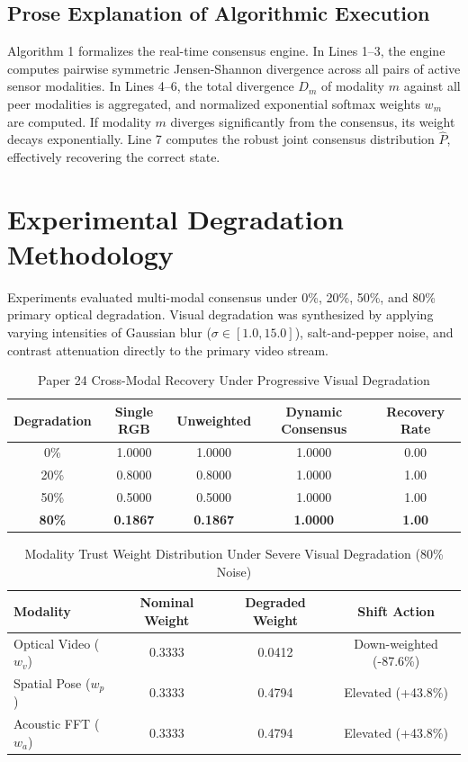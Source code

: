 \documentclass[conference]{IEEEtran}
\begin{document}
\subsection{Prose Explanation of Algorithmic Execution}
Algorithm 1 formalizes the real-time consensus engine. In Lines 1--3, the engine computes pairwise symmetric Jensen-Shannon divergence across all pairs of active sensor modalities. In Lines 4--6, the total divergence $D_m$ of modality $m$ against all peer modalities is aggregated, and normalized exponential softmax weights $w_m$ are computed. If modality $m$ diverges significantly from the consensus, its weight decays exponentially. Line 7 computes the robust joint consensus distribution $\hat{P}$, effectively recovering the correct state.

\section{Experimental Degradation Methodology}
Experiments evaluated multi-modal consensus under 0\%, 20\%, 50\%, and 80\% primary optical degradation. Visual degradation was synthesized by applying varying intensities of Gaussian blur ($\sigma \in [1.0, 15.0]$), salt-and-pepper noise, and contrast attenuation directly to the primary video stream.

\begin{table}[htbp]
\caption{Paper 24 Cross-Modal Recovery Under Progressive Visual Degradation}
\centering
\begin{tabular}{c c c c c}
\toprule
\textbf{Degradation} & \textbf{Single RGB} & \textbf{Unweighted} & \textbf{Dynamic Consensus} & \textbf{Recovery Rate} \\
\midrule
0\% & 1.0000 & 1.0000 & 1.0000 & 0.00 \\
20\% & 0.8000 & 0.8000 & 1.0000 & 1.00 \\
50\% & 0.5000 & 0.5000 & 1.0000 & 1.00 \\
\textbf{80\%} & \textbf{0.1867} & \textbf{0.1867} & \textbf{1.0000} & \textbf{1.00} \\
\bottomrule
\end{tabular}
\label{tab:p24_results}
\end{table}

\begin{table}[htbp]
\caption{Modality Trust Weight Distribution Under Severe Visual Degradation (80\% Noise)}
\centering
\begin{tabular}{l c c c}
\toprule
\textbf{Modality} & \textbf{Nominal Weight} & \textbf{Degraded Weight} & \textbf{Shift Action} \\
\midrule
Optical Video ($w_v$) & 0.3333 & 0.0412 & Down-weighted (-87.6\%) \\
Spatial Pose ($w_p$) & 0.3333 & 0.4794 & Elevated (+43.8\%) \\
Acoustic FFT ($w_a$) & 0.3333 & 0.4794 & Elevated (+43.8\%) \\
\bottomrule
\end{tabular}
\label{tab:weights}
\end{table}
\end{document}
